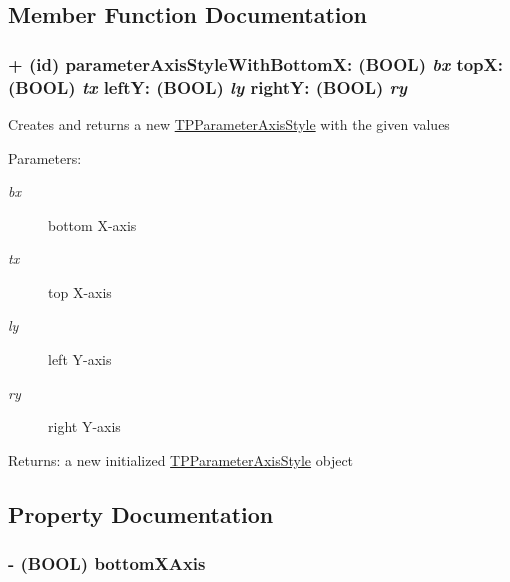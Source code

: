 \subsection{Member Function Documentation}
\hypertarget{interface_t_p_parameter_axis_style_ef15fbeffb6002dde5c1128b020cb921}{
\subsubsection[{parameterAxisStyleWithBottomX:topX:leftY:rightY:}]{\setlength{\rightskip}{0pt plus 5cm}+ (id) parameterAxisStyleWithBottomX: (BOOL) {\em bx}\/ topX: (BOOL) {\em tx}\/ leftY: (BOOL) {\em ly}\/ rightY: (BOOL) {\em ry}}}
\label{interface_t_p_parameter_axis_style_ef15fbeffb6002dde5c1128b020cb921}


Creates and returns a new \hyperlink{interface_t_p_parameter_axis_style}{TPParameterAxisStyle} with the given values \begin{Desc}
\item[Parameters:]
\begin{description}
\item[{\em bx}]bottom X-axis \item[{\em tx}]top X-axis \item[{\em ly}]left Y-axis \item[{\em ry}]right Y-axis \end{description}
\end{Desc}
\begin{Desc}
\item[Returns:]a new initialized \hyperlink{interface_t_p_parameter_axis_style}{TPParameterAxisStyle} object \end{Desc}


\subsection{Property Documentation}
\hypertarget{interface_t_p_parameter_axis_style_32960050862b00747067ff4e0a665025}{
\subsubsection[{bottomXAxis}]{\setlength{\rightskip}{0pt plus 5cm}- (BOOL) bottomXAxis}}
\label{interface_t_p_parameter_axis_style_32960050862b00747067ff4e0a665025}


